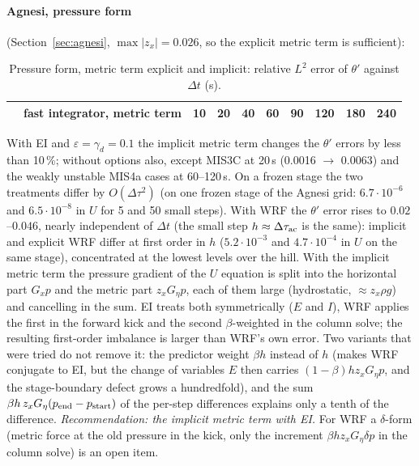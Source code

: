\documentclass[11pt,a4paper]{article}
\newcommand{\dtau}{\Delta\tau}
\begin{document}
\paragraph{Agnesi, pressure form} (Section~\ref{sec:agnesi}, $\max|z_x|=0.026$, so the explicit metric term is sufficient):
\begin{table}[ht]\centering\footnotesize
\caption{Pressure form, metric term explicit and implicit: relative $L^2$ error of $\theta'$ against $\Delta t$ (s).}\label{tab:mi}
\begin{tabular}{llcccccccc}\toprule
&fast integrator, metric term & 10 & 20 & 40 & 60 & 90 & 120 & 180 & 240\\\midrule

\bottomrule\end{tabular}
\end{table}
With EI and $\varepsilon=\gamma_d=0.1$ the implicit metric term changes the $\theta'$ errors by less than 10\,\%; without
options also, except MIS3C at 20\,s (0.0016 $\to$ 0.0063) and the weakly unstable MIS4a cases at 60--120\,s. On a
frozen stage the two treatments differ by $O(\dtau^2)$ (on one frozen stage of the Agnesi grid: $6.7\cdot10^{-6}$ and $6.5\cdot10^{-8}$ in $U$ for 5 and 50
small steps). With WRF the $\theta'$ error rises to $0.02$--$0.046$, nearly independent of $\Delta t$ (the small step $h\approx\dtau_{\rm ac}$
is the same): implicit and explicit WRF differ at first order in $h$ ($5.2\cdot10^{-3}$ and $4.7\cdot10^{-4}$ in $U$ on the same
stage), concentrated at the lowest levels over the hill. With the implicit metric term the pressure gradient
of the $U$ equation is split into the horizontal part $G_xp$ and the metric part $z_xG_\eta p$, each of them large
(hydrostatic, $\approx z_x\rho g$) and cancelling in the sum. EI treats both symmetrically ($E$ and $I$), WRF applies the
first in the forward kick and the second $\beta$-weighted in the column solve; the resulting first-order
imbalance is larger than WRF's own error. Two variants that were tried do not remove it: the predictor
weight $\beta h$ instead of $h$ (makes WRF conjugate to EI, but the change of variables $E$ then carries
$(1-\beta)hz_xG_\eta p$, and the stage-boundary defect grows a hundredfold), and the sum
$\beta h\,z_xG_\eta(p_{\rm end}-p_{\rm start})$ of the per-step differences explains only a tenth of the difference.
\emph{Recommendation: the implicit metric term with EI.} For WRF a $\delta$-form (metric force at the old
pressure in the kick, only the increment $\beta hz_xG_\eta\delta p$ in the column solve) is an open item.
\end{document}
